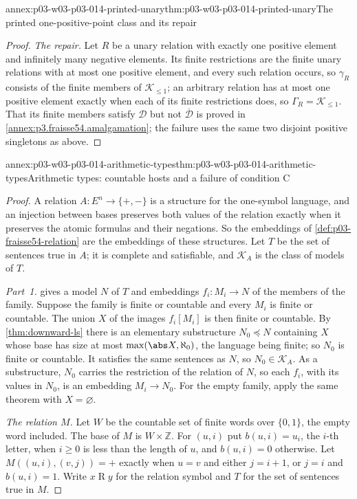 \begin{annexitem}{annex:p03-w03-p03-014-printed-unary}{thm:p03-w03-p03-014-printed-unary}{The printed one-positive-point class and its repair}
\begin{proof}
\emph{The repair.} Let \(R\) be a unary relation with exactly one
positive element and infinitely many negative elements. Its finite
restrictions are the finite unary relations with at most one positive
element, and every such relation occurs, so \(\gamma_R\) consists of the
finite members of \(\mathcal K_{\leq1}\); an arbitrary relation has at
most one positive element exactly when each of its finite restrictions
does, so \(\Gamma_R=\mathcal K_{\leq1}\). That its finite members
satisfy \(\mathcal D\) but not \(\overline{\mathcal D}\) is proved in
\cref{annex:p3.fraisse54.amalgamation}; the failure uses the same two
disjoint positive singletons as above.
\end{proof}
\end{annexitem}

\begin{annexitem}{annex:p03-w03-p03-014-arithmetic-types}{thm:p03-w03-p03-014-arithmetic-types}{Arithmetic types: countable hosts and a failure of condition C}
\begin{proof}
A relation \(A:E^n\to\{+,-\}\) is a structure for the one-symbol
language, and an injection between bases preserves both values of the
relation exactly when it preserves the atomic formulas and their
negations. So the embeddings of \cref{def:p03-fraisse54-relation} are the
embeddings of these structures. Let \(T\) be the set of sentences true in
\(A\); it is complete and satisfiable, and \(\mathcal K_A\) is the class
of models of \(T\).

\emph{Part~1.}  gives a model
\(N\) of \(T\) and embeddings \(f_i:M_i\to N\) of the members of the
family. Suppose the family is finite or countable and every \(M_i\) is
finite or countable. The union \(X\) of the images \(f_i[M_i]\) is then
finite or countable. By \cref{thm:downward-ls} there is an elementary
substructure \(N_0\preccurlyeq N\) containing \(X\) whose base has size
at most \(\max(\abs X,\aleph_0)\), the language being finite; so \(N_0\)
is finite or countable. It satisfies the same sentences as \(N\), so
\(N_0\in\mathcal K_A\). As a substructure, \(N_0\) carries the
restriction of the relation of \(N\), so each \(f_i\), with its values in
\(N_0\), is an embedding \(M_i\to N_0\). For the empty family, apply the
same theorem with \(X=\varnothing\).

\emph{The relation \(M\).} Let \(W\) be the countable set of finite
words over \(\{0,1\}\), the empty word included. The base of \(M\) is
\(W\times\mathbb Z\). For \((u,i)\) put \(b(u,i)=u_i\), the \(i\)-th
letter, when \(i\geq0\) is less than the length of \(u\), and \(b(u,i)=0\) otherwise. Let
\(M((u,i),(v,j))=+\) exactly when \(u=v\) and either \(j=i+1\), or
\(j=i\) and \(b(u,i)=1\). Write \(x\mathrel{R}y\) for the relation
symbol and \(T\) for the set of sentences true in \(M\).


\end{proof}
\end{annexitem}
